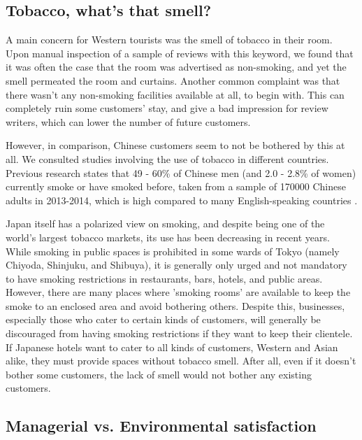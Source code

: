 \documentclass[review]{elsarticle}
\begin{document}
\subsection{Tobacco, what's that smell?}\label{disc:tobacco}

A main concern for Western tourists was the smell of tobacco in their room. Upon manual inspection of a sample of reviews with this keyword, we found that it was often the case that the room was advertised as non-smoking, and yet the smell permeated the room and curtains. Another common complaint was that there wasn't any non-smoking facilities available at all, to begin with. This can completely ruin some customers' stay, and give a bad impression for review writers, which can lower the number of future customers.

However, in comparison, Chinese customers seem to not be bothered by this at all. We consulted studies involving the use of tobacco in different countries. Previous research states that 49 - 60\% of Chinese men (and 2.0 - 2.8\% of women) currently smoke or have smoked before, taken from a sample of \num[group-separator={,}]{170000} Chinese adults in 2013-2014, which is high compared to many English-speaking countries \cite[][]{zhang2019tobacco, who2015tobacco}.

Japan itself has a polarized view on smoking, and despite being one of the world's largest tobacco markets, its use has been decreasing in recent years. While smoking in public spaces is prohibited in some wards of Tokyo (namely Chiyoda, Shinjuku, and Shibuya), it is generally only urged and not mandatory to have smoking restrictions in restaurants, bars, hotels, and public areas. However, there are many places where 'smoking rooms' are available to keep the smoke to an enclosed area and avoid bothering others. Despite this, businesses, especially those who cater to certain kinds of customers, will generally be discouraged from having smoking restrictions if they want to keep their clientele. If Japanese hotels want to cater to all kinds of customers, Western and Asian alike, they must provide spaces without tobacco smell. After all, even if it doesn't bother some customers, the lack of smell would not bother any existing customers. 

\subsection{Managerial vs. Environmental satisfaction}\label{disc:hyp3}
\end{document}
